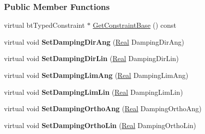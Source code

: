 \subsubsection*{Public Member Functions}
\begin{DoxyCompactItemize}
\item 
virtual btTypedConstraint $\ast$ \hyperlink{classphys_1_1SliderConstraint_ae504381efb11c23b0aec8ab5c9eeb7ab}{GetConstraintBase} () const 
\item 
\hypertarget{classphys_1_1SliderConstraint_a250041975345f97799de9c7fde036fda}{
virtual void {\bfseries SetDampingDirAng} (\hyperlink{namespacephys_af7eb897198d265b8e868f45240230d5f}{Real} DampingDirAng)}
\label{classphys_1_1SliderConstraint_a250041975345f97799de9c7fde036fda}

\item 
\hypertarget{classphys_1_1SliderConstraint_a6c1c336f7c6557a8fcb4413878d52934}{
virtual void {\bfseries SetDampingDirLin} (\hyperlink{namespacephys_af7eb897198d265b8e868f45240230d5f}{Real} DampingDirLin)}
\label{classphys_1_1SliderConstraint_a6c1c336f7c6557a8fcb4413878d52934}

\item 
\hypertarget{classphys_1_1SliderConstraint_af3d0a046af12ca5e2d35bdfc609ed27b}{
virtual void {\bfseries SetDampingLimAng} (\hyperlink{namespacephys_af7eb897198d265b8e868f45240230d5f}{Real} DampingLimAng)}
\label{classphys_1_1SliderConstraint_af3d0a046af12ca5e2d35bdfc609ed27b}

\item 
\hypertarget{classphys_1_1SliderConstraint_ae20c29e2b2a3e6c4d9498371d343484e}{
virtual void {\bfseries SetDampingLimLin} (\hyperlink{namespacephys_af7eb897198d265b8e868f45240230d5f}{Real} DampingLimLin)}
\label{classphys_1_1SliderConstraint_ae20c29e2b2a3e6c4d9498371d343484e}

\item 
\hypertarget{classphys_1_1SliderConstraint_a69a89c6984f3ba738a84e52fc8e47255}{
virtual void {\bfseries SetDampingOrthoAng} (\hyperlink{namespacephys_af7eb897198d265b8e868f45240230d5f}{Real} DampingOrthoAng)}
\label{classphys_1_1SliderConstraint_a69a89c6984f3ba738a84e52fc8e47255}

\item 
\hypertarget{classphys_1_1SliderConstraint_afc45b003e5ee277d8991130534b2e4bf}{
virtual void {\bfseries SetDampingOrthoLin} (\hyperlink{namespacephys_af7eb897198d265b8e868f45240230d5f}{Real} DampingOrthoLin)}
\label{classphys_1_1SliderConstraint_afc45b003e5ee277d8991130534b2e4bf}


\end{DoxyCompactItemize}
